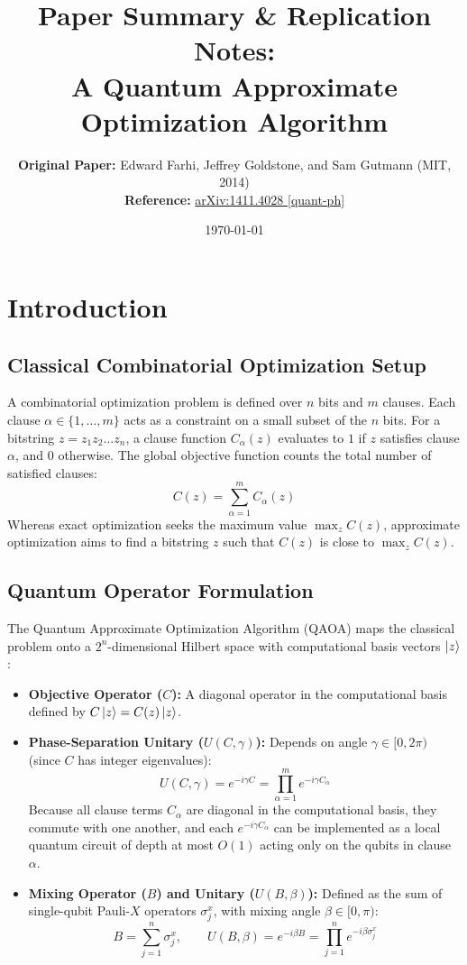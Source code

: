 \documentclass[11pt,a4paper]{article}
\title{\textbf{Paper Summary \& Replication Notes:\\ A Quantum Approximate Optimization Algorithm}}
\author{
    \textbf{Original Paper:} Edward Farhi, Jeffrey Goldstone, and Sam Gutmann (MIT, 2014) \\
    \textbf{Reference:} \href{https://arxiv.org/abs/1411.4028}{arXiv:1411.4028 [quant-ph]}
}
\date{\today}
\begin{document}
\maketitle

\section{Introduction}

\subsection{Classical Combinatorial Optimization Setup}
A combinatorial optimization problem is defined over $n$ bits and $m$ clauses. Each clause $\alpha \in \{1, \dots, m\}$ acts as a constraint on a small subset of the $n$ bits. For a bitstring $z = z_1 z_2 \dots z_n$, a clause function $C_\alpha(z)$ evaluates to $1$ if $z$ satisfies clause $\alpha$, and $0$ otherwise. The global objective function counts the total number of satisfied clauses:
\begin{equation}
    C(z) = \sum_{\alpha=1}^{m} C_\alpha(z)
\end{equation}
Whereas exact optimization seeks the maximum value $\max_z C(z)$, approximate optimization aims to find a bitstring $z$ such that $C(z)$ is close to $\max_z C(z)$.

\subsection{Quantum Operator Formulation}
The Quantum Approximate Optimization Algorithm (QAOA) maps the classical problem onto a $2^n$-dimensional Hilbert space with computational basis vectors $\ket{z}$:
\begin{itemize}[leftmargin=*]
    \item \textbf{Objective Operator ($C$):} A diagonal operator in the computational basis defined by $C\ket{z} = C(z)\ket{z}$.
    \item \textbf{Phase-Separation Unitary ($U(C, \gamma)$):} Depends on angle $\gamma \in [0, 2\pi)$ (since $C$ has integer eigenvalues):
    \begin{equation}
        U(C, \gamma) = e^{-i\gamma C} = \prod_{\alpha=1}^{m} e^{-i\gamma C_\alpha}
    \end{equation}
    Because all clause terms $C_\alpha$ are diagonal in the computational basis, they commute with one another, and each $e^{-i\gamma C_\alpha}$ can be implemented as a local quantum circuit of depth at most $O(1)$ acting only on the qubits in clause $\alpha$.
    
    \item \textbf{Mixing Operator ($B$) and Unitary ($U(B, \beta)$):} Defined as the sum of single-qubit Pauli-$X$ operators $\sigma_j^x$, with mixing angle $\beta \in [0, \pi)$:
    \begin{equation}
        B = \sum_{j=1}^{n} \sigma_j^x, \qquad U(B, \beta) = e^{-i\beta B} = \prod_{j=1}^{n} e^{-i\beta \sigma_j^x}
    \end{equation}
\end{itemize}
\end{document}
